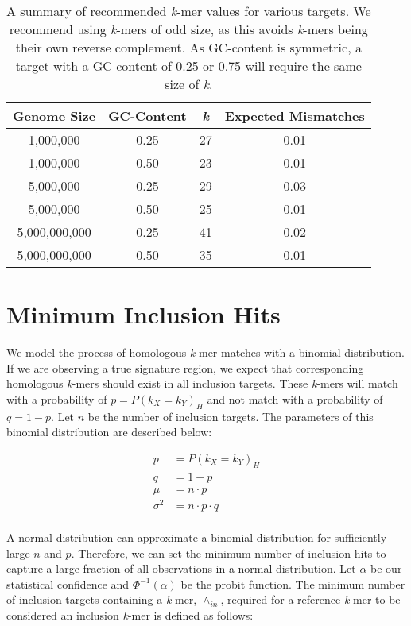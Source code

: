 \documentclass{article}
\begin{document}
\begin{table}
\centering
\begin{tabular}{ | c | c | c | c | }
  \hline
  \textbf{Genome Size} & \textbf{GC-Content} & \textbf{\textit{k}} & \textbf{Expected Mismatches} \\ \hline
  1,000,000 & 0.25 & 27 & 0.01\\
  1,000,000 & 0.50 & 23 & 0.01\\
  5,000,000 & 0.25 & 29 & 0.03\\
  5,000,000 & 0.50 & 25 & 0.01\\
  5,000,000,000 & 0.25 & 41 & 0.02\\
  5,000,000,000 & 0.50 & 35 & 0.01\\ \hline
\end{tabular}
\caption{A summary of recommended \textit{k}-mer values for various targets. We recommend using \textit{k}-mers of odd size, as this avoids \textit{k}-mers being their own reverse complement. As GC-content is symmetric, a target with a GC-content of 0.25 or 0.75 will require the same size of \textit{k}.}
\label{table:kmer-sizes}
\end{table}

\section{Minimum Inclusion Hits}

We model the process of homologous \textit{k}-mer matches with a binomial distribution. If we are observing a true signature region, we expect that corresponding homologous \textit{k}-mers should exist in all inclusion targets. These \textit{k}-mers will match with a probability of \(p = P(k_X = k_Y)_{H}\) and not match with a probability of \(q = 1 - p\). Let \(n\) be the number of inclusion targets. The parameters of this binomial distribution are described below:

\begin{equation}
\begin{split}
  p &= P(k_X = k_Y)_{H} \\
  q &= 1 - p \\
  \mu &= n \cdot p \\
  \sigma^2 &= n \cdot p \cdot q \\
\end{split}
\end{equation}

A normal distribution can approximate a binomial distribution for sufficiently large \(n\) and \(p\). Therefore, we can set the minimum number of inclusion hits to capture a large fraction of all observations in a normal distribution. Let \(\alpha\) be our statistical confidence and \(\Phi^{-1}(\alpha)\) be the probit function. The minimum number of inclusion targets containing a \textit{k}-mer, \(\wedge_{in}\), required for a reference \textit{k}-mer to be considered an inclusion \textit{k}-mer is defined as follows:
\end{document}
